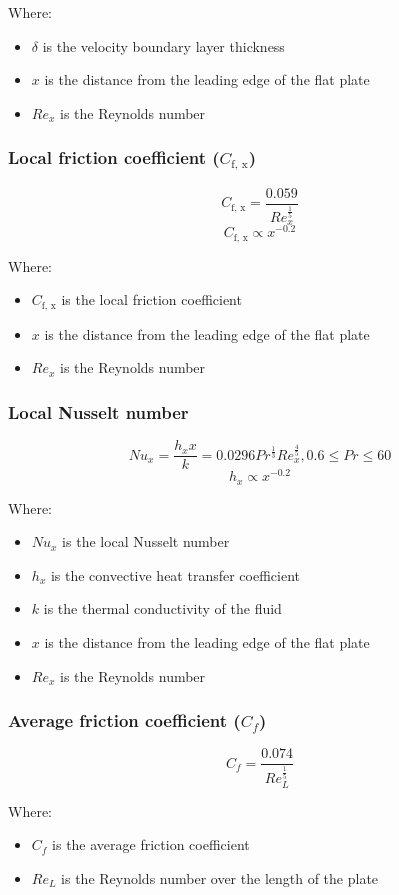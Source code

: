 \documentclass[11pt]{article}
\begin{document}
Where:
\begin{itemize}
\item \(\delta\) is the velocity boundary layer thickness
\item \(x\) is the distance from the leading edge of the flat plate
\item \(Re_x\) is the Reynolds number
\end{itemize}
\subsubsection{Local friction coefficient (\(C_{\text{f, x}}\))}
\label{sec:orgc439f1d}
\[C_{\text{f, x}} = \frac{0.059}{Re_x^{\frac{1}{5}}}\]
\[C_{\text{f, x}} \propto x^{-0.2}\]

Where:
\begin{itemize}
\item \(C_{\text{f, x}}\) is the local friction coefficient
\item \(x\) is the distance from the leading edge of the flat plate
\item \(Re_x\) is the Reynolds number
\end{itemize}
\subsubsection{Local Nusselt number}
\label{sec:org39719cc}
\[Nu_x = \frac{h_x x}{k} = 0.0296 Pr^{\frac{1}{3}} Re_x^{\frac{4}{5}}, 0.6 \le Pr \le 60\]
\[h_x \propto x^{-0.2}\]

Where:
\begin{itemize}
\item \(Nu_x\) is the local Nusselt number
\item \(h_x\) is the convective heat transfer coefficient
\item \(k\) is the thermal conductivity of the fluid
\item \(x\) is the distance from the leading edge of the flat plate
\item \(Re_x\) is the Reynolds number
\end{itemize}
\subsubsection{Average friction coefficient (\(C_f\))}
\label{sec:org4c0d875}
\[C_f = \frac{0.074}{Re_L^{\frac{1}{5}}}\]

Where:
\begin{itemize}
\item \(C_f\) is the average friction coefficient
\item \(Re_L\) is the Reynolds number over the length of the plate
\end{itemize}
\end{document}
